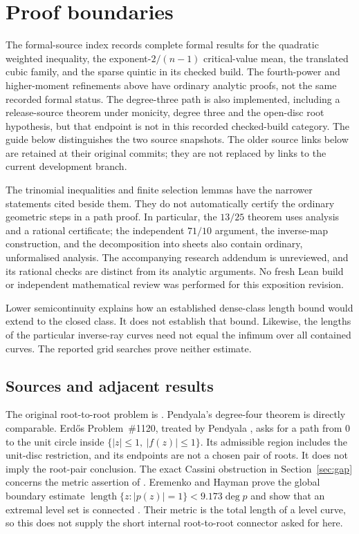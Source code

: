 \documentclass[11pt]{article}
\begin{document}
\section{Proof boundaries}\label{sec:evidence-ledger}

The formal-source index records complete formal results for the
quadratic weighted inequality, the exponent-$2/(n-1)$ critical-value
mean, the translated cubic family, and the sparse quintic in its checked
build. The fourth-power and higher-moment refinements above have ordinary
analytic proofs, not the same recorded formal status. The degree-three path is
also implemented, including a release-source theorem under monicity,
degree three and the open-disc root hypothesis, but that endpoint is not
in this recorded checked-build category. The guide below distinguishes the two source snapshots. The older source
links below are retained at their original commits; they are not replaced
by links to the current development branch.

The trinomial inequalities and finite selection lemmas have the narrower
statements cited beside them. They do not automatically certify the
ordinary geometric steps in a path proof. In particular, the $13/25$
theorem uses analysis and a rational certificate; the independent $71/10$
argument, the inverse-map construction, and the decomposition into sheets
also contain ordinary, unformalised analysis. The accompanying research
addendum is unreviewed, and its rational checks are distinct from its
analytic arguments. No fresh Lean build or independent mathematical
review was performed for this exposition revision.

Lower semicontinuity explains how an established dense-class length bound
would extend to the closed class. It does not establish that bound.
Likewise, the lengths of the particular inverse-ray curves need not equal
the infimum over all contained curves. The reported grid searches prove
neither estimate.

\subsection*{Sources and adjacent results}\label{sec:1041-sources}

The original root-to-root problem is \cite[Problem~5, p.~139]{ehp1958}.
Pendyala's degree-four theorem \cite[Theorem~1]{june2026} is directly comparable.
Erd\H{o}s Problem~\#1120, treated by Pendyala
\cite[Definition~1.1 and Theorem~1.2]{pendyala2026shortest}, asks for a path
from $0$ to the unit circle inside $\{|z|\le1,\ |f(z)|\le1\}$. Its
admissible region includes the unit-disc restriction, and its endpoints
are not a chosen pair of roots. It does not imply the root-pair conclusion.  The exact Cassini
obstruction in Section~\ref{sec:gap} concerns the metric assertion of
\cite[Prop.~12]{march2026}.  Eremenko and Hayman prove the global boundary
estimate
$\operatorname{length}\{z:|p(z)|=1\}<9.173\deg p$ and show that an extremal
level set is connected \cite[Thm.~1 and the lemma on connectedness]
{eremenko-hayman}.  Their metric is the total length of a level curve, so this
does not supply the short internal root-to-root connector asked for here.
\end{document}

